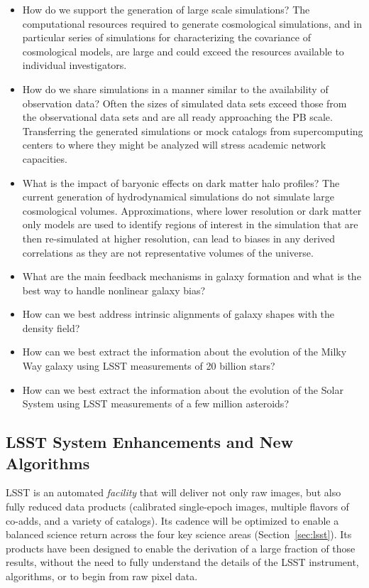\documentclass{iau}
\begin{document}
\begin{itemize}
\item How do we support the generation of large scale simulations? The
  computational resources required to generate cosmological
  simulations, and in particular series of simulations for
  characterizing the covariance of cosmological models, are large and
  could exceed the resources available to individual investigators.
\item How do we share simulations in a manner similar to the
  availability of observation data? Often the sizes of simulated data
  sets exceed those from the observational data sets and are all ready
  approaching the PB scale. Transferring the generated simulations or
  mock catalogs from supercomputing centers to where they might be
  analyzed will stress academic network capacities.
\item What is the impact of baryonic effects on dark matter halo
  profiles? The current generation of hydrodynamical simulations do
  not simulate large cosmological volumes. Approximations, where lower
  resolution or dark matter only models are used to identify regions
  of interest in the simulation that are then re-simulated at higher
  resolution, can lead to biases in any derived correlations as they
  are not representative volumes of the universe.
\item What are the main feedback mechanisms in galaxy formation and
  what is the best way to handle nonlinear galaxy bias?
\item How can we best address intrinsic alignments of galaxy shapes with the density field? 
\item How can we best extract the information about the evolution of the Milky Way galaxy using 
         LSST measurements of 20 billion stars? 
\item How can we best extract the information about the evolution of the Solar System using LSST 
         measurements of a few million asteroids?  
\end{itemize}

\subsection{LSST System Enhancements and New Algorithms}

LSST is an automated {\em facility} that will deliver not only raw images, 
but also fully reduced data products (calibrated single-epoch images,
multiple flavors of co-adds, and a variety of catalogs). Its cadence will 
be optimized to enable a balanced science return across the four key science
areas (Section~\ref{sec:lsst}). Its products have been designed to enable the
derivation of a large fraction of those results, without the need to fully
understand the details of the LSST instrument, algorithms, or to begin
from raw pixel data.
\end{document}
